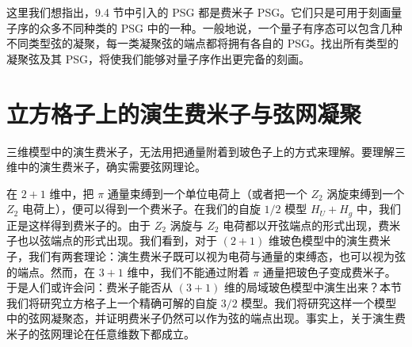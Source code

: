 
这里我们想指出，9.4 节中引入的 PSG 都是费米子 PSG。它们只是可用于刻画量子序的众多不同种类的 PSG 中的一种。一般地说，一个量子有序态可以包含几种不同类型弦的凝聚，每一类凝聚弦的端点都将拥有各自的 PSG。找出所有类型的凝聚弦及其 PSG，将使我们能够对量子序作出更完备的刻画。

\section{立方格子上的演生费米子与弦网凝聚}

\begin{keypoints}
\item 三维模型中的演生费米子，无法用把通量附着到玻色子上的方式来理解。要理解三维中的演生费米子，确实需要弦网理论。
\end{keypoints}

在 $2+1$ 维中，把 $\pi$ 通量束缚到一个单位电荷上（或者把一个 $Z_2$ 涡旋束缚到一个 $Z_2$ 电荷上），便可以得到一个费米子。在我们的自旋 $1/2$ 模型 $H_U+H_g$ 中，我们正是这样得到费米子的。由于 $Z_2$ 涡旋与 $Z_2$ 电荷都以开弦端点的形式出现，费米子也以弦端点的形式出现。我们看到，对于 $(2+1)$ 维玻色模型中的演生费米子，我们有两套理论：演生费米子既可以视为电荷与通量的束缚态，也可以视为弦的端点。然而，在 $3+1$ 维中，我们不能通过附着 $\pi$ 通量把玻色子变成费米子。于是人们或许会问：费米子能否从 $(3+1)$ 维的局域玻色模型中演生出来？本节我们将研究立方格子上一个精确可解的自旋 $3/2$ 模型。我们将研究这样一个模型中的弦网凝聚态，并证明费米子仍然可以作为弦的端点出现。事实上，关于演生费米子的弦网理论在任意维数下都成立。


